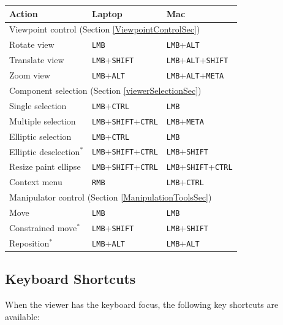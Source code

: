 \documentclass{article}
\begin{document}
\begin{center}
\begin{tabular}{|l|l|l|}
\hline
Action & {\sf Laptop} & {\sf Mac}\\
\hline
\hline
\multicolumn{3}{|l|}{Viewpoint control (Section \ref{ViewpointControlSec})}\\
\hline
Rotate view & 
{\tt LMB} & {\tt LMB}+{\tt ALT}\\
Translate view & 
{\tt LMB}+{\tt SHIFT} & {\tt LMB}+{\tt ALT}+{\tt SHIFT} \\
Zoom view & 
{\tt LMB}+{\tt ALT} & {\tt LMB}+{\tt ALT}+{\tt META} \\
\hline
\multicolumn{3}{|l|}{Component selection (Section \ref{viewerSelectionSec})}\\
\hline
Single selection & 
{\tt LMB}+{\tt CTRL} & {\tt LMB} \\
Multiple selection & 
{\tt LMB}+{\tt SHIFT}+{\tt CTRL} & {\tt LMB}+{\tt META} \\
Elliptic selection & 
{\tt LMB}+{\tt CTRL} & {\tt LMB} \\
Elliptic deselection$^*$ & 
{\tt LMB}+{\tt SHIFT}+{\tt CTRL} & {\tt LMB}+{\tt SHIFT} \\
Resize paint ellipse & 
{\tt LMB}+{\tt SHIFT}+{\tt CTRL} & {\tt LMB}+{\tt SHIFT}+{\tt CTRL}\\
Context menu & 
{\tt RMB} & {\tt LMB}+{\tt CTRL} \\
\hline
\multicolumn{3}{|l|}{Manipulator control (Section \ref{ManipulationToolsSec})}\\
\hline
Move & 
{\tt LMB} & {\tt LMB} \\
Constrained move$^*$ & 
{\tt LMB}+{\tt SHIFT} & {\tt LMB}+{\tt SHIFT} \\
Reposition$^*$ & 
{\tt LMB}+{\tt ALT} & {\tt LMB}+{\tt ALT} \\
\hline
\end{tabular}
\end{center}

\subsection{Keyboard Shortcuts}
\label{keyShortcutsSec}

When the viewer has the keyboard focus, the following key shortcuts
are available:
\end{document}
